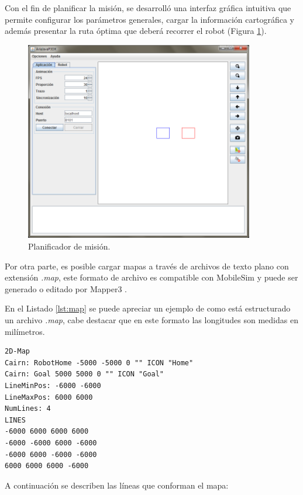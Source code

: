 \documentclass[11pt,twoside,A5]{article}
\newcommand{\reflistings}[1]{Listado \ref{#1}}
\newcommand{\reffigure}[1]{Figura \ref{#1}}
\newcommand{\refpfigure}[1]{(\reffigure{#1})}
\begin{document}
Con el fin de planificar la misión, se desarrolló una interfaz gráfica intuitiva que permite configurar
los parámetros generales, cargar la información cartográfica y además presentar la ruta óptima que deberá recorrer el robot \refpfigure{fig:planificador}. 

\begin{figure}[here]
\begin{center}
\includegraphics[width=10cm]{ventana-principal.png} 
\caption{Planificador de misión.}
\label{fig:planificador}
\end{center}
\end{figure} 

Por otra parte, es posible cargar mapas a través de archivos de texto plano con extensión \textit{.map}, 
este formato de archivo es compatible con MobileSim y puede ser generado o editado por
Mapper3 \cite{mapper2014}.

En el \reflistings{lst:map} se puede apreciar un ejemplo de como está estructurado un archivo \textit{.map},
cabe destacar que en este formato las longitudes son medidas en milímetros.

\begin{minipage}{\linewidth}
\begin{lstlisting}[caption={Ejemplo archivo mapa.}, label=lst:map]
2D-Map
Cairn: RobotHome -5000 -5000 0 "" ICON "Home"
Cairn: Goal 5000 5000 0 "" ICON "Goal" 
LineMinPos: -6000 -6000
LineMaxPos: 6000 6000
NumLines: 4
LINES
-6000 6000 6000 6000
-6000 -6000 6000 -6000
-6000 6000 -6000 -6000
6000 6000 6000 -6000
\end{lstlisting}
\end{minipage}

A continuación se describen las líneas que conforman el mapa:
\end{document}
